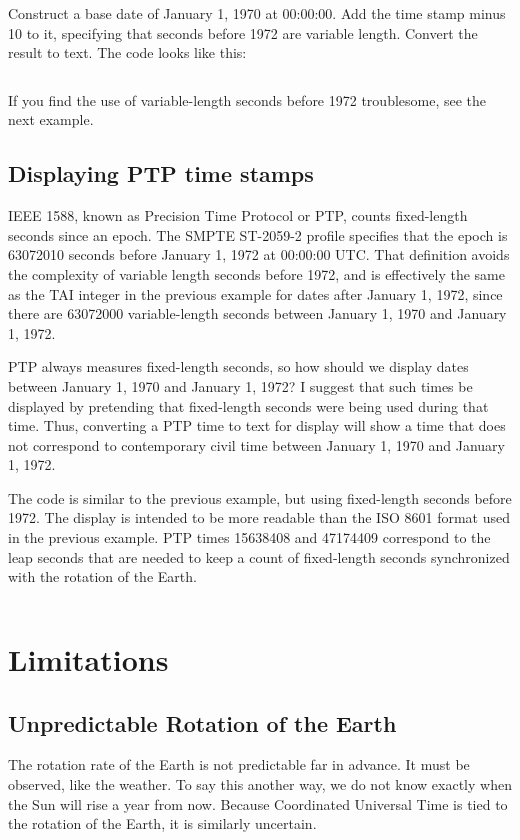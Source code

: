 \documentclass[letterpaper,twoside]{article}
\begin{document}
Construct a base date of January 1, 1970 at 00:00:00.  Add the time stamp
minus 10 to it, specifying that seconds before 1972 are variable length.
Convert the result to text.  The code looks like this:
\inputminted[firstline=41,lastline=67]{c}{example_04.c}

If you find the use of variable-length seconds before 1972 troublesome,
see the next example.

\subsection{Displaying PTP time stamps}
\label{example:PTP}
IEEE 1588, known as Precision Time Protocol or PTP, counts fixed-length
seconds since an epoch.  The SMPTE ST-2059-2 profile specifies that the epoch is
\num{63072010} seconds before January 1, 1972 at 00:00:00 UTC.  That definition
avoids the complexity of variable length seconds before 1972, and is
effectively the same as the TAI integer in the previous example
for dates after January 1, 1972, since there are \num{63072000}
variable-length seconds between January 1, 1970 and January 1, 1972.

PTP always measures fixed-length seconds, so how should we display
dates between January 1, 1970 and January 1, 1972?  I suggest that
such times be displayed by pretending that fixed-length seconds
were being used during that time.  Thus, converting a PTP time
to text for display will show a time that does not correspond to
contemporary civil time between January 1, 1970 and January 1, 1972.

The code is similar to the previous example, but using
fixed-length seconds before 1972.  The display is intended to be
more readable than the ISO 8601 format used in the previous example.
PTP times \num{15638408} and \num{47174409} correspond to the leap
seconds that are needed to keep a count of fixed-length seconds
synchronized with the rotation of the Earth.

\inputminted[firstline=41,lastline=74]{c}{example_05.c}

\section{Limitations}
\subsection{Unpredictable Rotation of the Earth}
The rotation rate of the Earth is not predictable far in advance.  It must
be observed, like the weather.  To say this another way, we do not know
exactly when the Sun will rise a year from now.  Because Coordinated
Universal Time is tied to the rotation of the Earth, it is similarly
uncertain.
\end{document}
